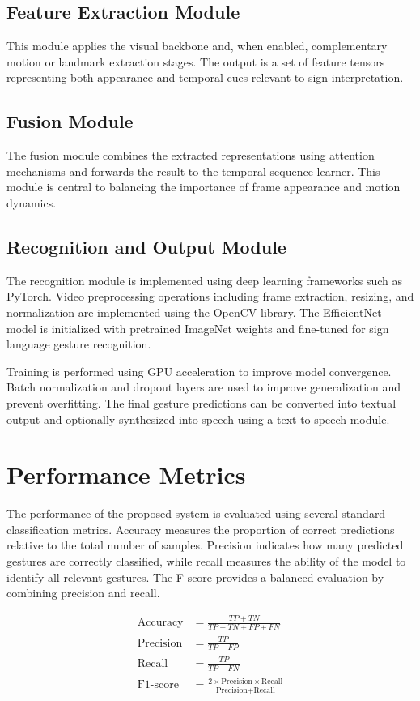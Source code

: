 \documentclass[runningheads]{llncs}
\begin{document}
\subsection{Feature Extraction Module}
This module applies the visual backbone and, when enabled, complementary motion or landmark extraction stages. The output is a set of feature tensors representing both appearance and temporal cues relevant to sign interpretation.

\subsection{Fusion Module}
The fusion module combines the extracted representations using attention mechanisms and forwards the result to the temporal sequence learner. This module is central to balancing the importance of frame appearance and motion dynamics.

\subsection{Recognition and Output Module}
The recognition module is implemented using deep learning frameworks such as PyTorch. Video preprocessing operations including frame extraction, resizing, and normalization are implemented using the OpenCV library. The EfficientNet model is initialized with pretrained ImageNet weights and fine-tuned for sign language gesture recognition.

Training is performed using GPU acceleration to improve model convergence. Batch normalization and dropout layers are used to improve generalization and prevent overfitting. The final gesture predictions can be converted into textual output and optionally synthesized into speech using a text-to-speech module.

\section{Performance Metrics}
The performance of the proposed system is evaluated using several standard classification metrics. Accuracy measures the proportion of correct predictions relative to the total number of samples. Precision indicates how many predicted gestures are correctly classified, while recall measures the ability of the model to identify all relevant gestures. The F-score provides a balanced evaluation by combining precision and recall.

\begin{align}
\text{Accuracy} &= \frac{TP + TN}{TP + TN + FP + FN} \\
\text{Precision} &= \frac{TP}{TP + FP} \\
\text{Recall} &= \frac{TP}{TP + FN} \\
\text{F1-score} &= \frac{2 \times \text{Precision} \times \text{Recall}}{\text{Precision} + \text{Recall}}
\end{align}
\end{document}
